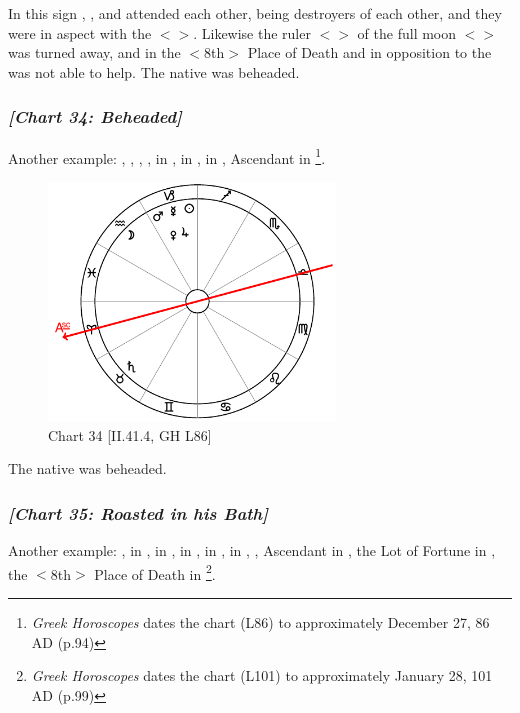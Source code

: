 In this sign \Saturn, \Mercury, and \Mars\xspace attended each other, being destroyers of each other, and they were in aspect with the \Moon\xspace $<$\Square$>$. Likewise the ruler $<$\Saturn$>$ of the full moon $<$\Capricorn$>$ was turned away, and \Jupiter\xspace in the $<$8th$>$ Place of Death and in opposition to the \Sun\xspace was not able to help. The native was beheaded.
\newpage
\subsubsection{\textit{[Chart 34: Beheaded]}}
Another example: \Sun, \Mercury, \Mars, \Jupiter, \Venus\xspace in \Capricorn, \Moon\xspace in \Aquarius, \Saturn\xspace in \Taurus, Ascendant in \Aries
\footnote{\textit{Greek Horoscopes} dates the chart (L86) to approximately December 27, 86 AD (p.94)}.

\clearpage
\begin{figure}
\centering
\vspace{-20pt}
\includegraphics[width=0.68\textwidth]{charts/2_41_4}
\caption{Chart 34 [II.41.4, GH L86]}
\label{fig:chart34}
\end{figure} 

The native was beheaded.
\newpage
\subsubsection{\textit{[Chart 35: Roasted in his Bath]}}
Another example: \Sun, \Venus\xspace in \Aquarius, \Moon\xspace in \Gemini, \Saturn\xspace in \Scorpio, \Jupiter\xspace in \Pisces, \Mars\xspace in \Cancer, \Mercury, Ascendant in \Capricorn, the Lot of Fortune in \Virgo, the $<$8th$>$ Place of Death in \Aries
\footnote{\textit{Greek Horoscopes} dates the chart (L101) to approximately January 28, 101 AD (p.99)}.

